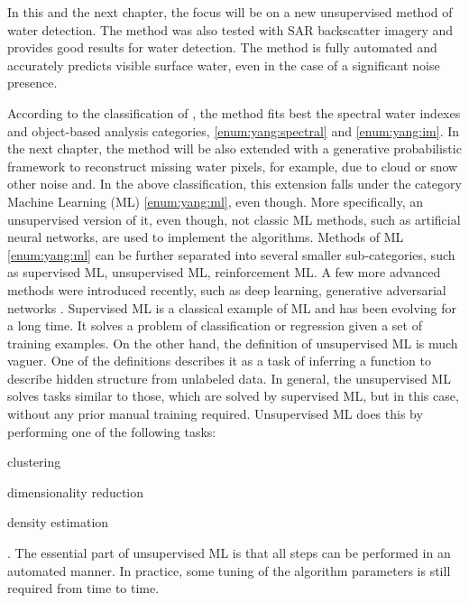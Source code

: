 In this and the next chapter, the focus will be on a new unsupervised method of water detection. The method was also tested with SAR backscatter imagery and provides good results for water detection. The method is fully automated and accurately predicts visible surface water, even in the case of a significant noise presence. 

According to the classification of \citet{yang2015landsat}, the method fits best the spectral water indexes and object-based analysis categories, \ref{enum:yang:spectral} and \ref{enum:yang:im}. In the next chapter, the method will be also extended with a generative probabilistic framework to reconstruct missing water pixels, for example, due to cloud or snow other noise and. In the above classification, this extension falls under the category Machine Learning (ML) \ref{enum:yang:ml}, even though. More specifically, an unsupervised version of it, even though, not classic ML methods, such as artificial neural networks, are used to implement the algorithms. Methods of ML \ref{enum:yang:ml} can be further separated into several smaller sub-categories, such as supervised ML, unsupervised ML, reinforcement ML. A few more advanced methods were introduced recently, such as deep learning, generative adversarial networks \citet{goodfellow2014generative}. Supervised ML is a classical example of ML and has been evolving for a long time. It solves a problem of classification or regression given a set of training examples. On the other hand, the definition of unsupervised ML is much vaguer. One of the definitions describes it as a task of inferring a function to describe hidden structure from unlabeled data. In general, the unsupervised ML solves tasks similar to those, which are solved by supervised ML, but in this case, without any prior manual training required. Unsupervised ML does this by performing one of the following tasks: 
\begin{enumerate*}[label=(\emph{\arabic*})]
	\item \label {enum:ml2:clustering} clustering
	\item \label {enum:ml2:dimentionality-reduction} dimensionality reduction
	\item \label {enum:ml2:density} density estimation
\end{enumerate*}.
The essential part of unsupervised ML is that all steps can be performed in an automated manner. In practice, some tuning of the algorithm parameters is still required from time to time.

